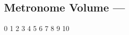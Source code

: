\subsection[Metronome Volume]{Metronome Volume --- \UiKey{\SET}}









































0
1
2
3
4
5
6
7
8
9
10
